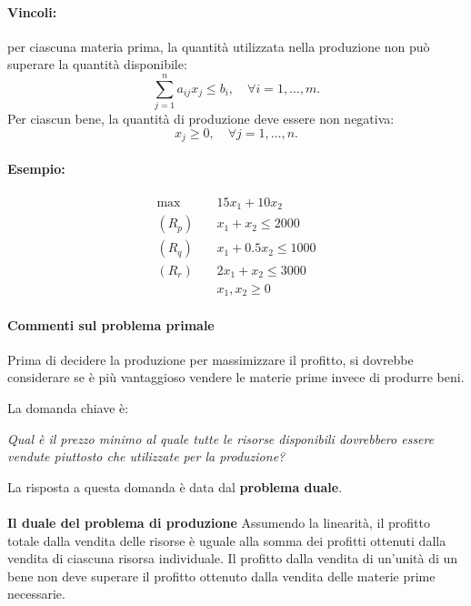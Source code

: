 \documentclass[a4paper, 11pt]{article}
\begin{document}
        \paragraph{Vincoli:} per ciascuna materia prima, la quantità utilizzata nella produzione non può superare la quantità disponibile:
        \[ \sum_{j=1}^{n} a_{ij} x_j \leq b_i, \quad \forall i=1,\dots,m. \]
        Per ciascun bene, la quantità di produzione deve essere non negativa:
        \[ x_j \geq 0, \quad \forall j=1,\dots,n. \]

        \paragraph{Esempio: }

        \begin{align*}
            \max & \quad 15x_{1} + 10x_{2} \\
            (R_p)& \quad x_{1} + x_{2} \leq 2000 \\
            (R_q) & \quad x_{1} + 0.5x_{2} \leq 1000 \\
            (R_r) & \quad 2x_{1} + x_{2} \leq 3000 \\
            & \quad x_{1}, x_{2} \geq 0
        \end{align*}

        \paragraph{Commenti sul problema primale}
        Prima di decidere la produzione per massimizzare il profitto, si dovrebbe considerare se è più vantaggioso vendere le materie prime invece di produrre beni.

        La domanda chiave è:

        \textit{Qual è il prezzo minimo al quale tutte le risorse disponibili dovrebbero essere vendute piuttosto che utilizzate per la produzione?}

        La risposta a questa domanda è data dal \textbf{problema duale}.

        \paragraph{}
        \textbf{Il duale del problema di produzione}
        Assumendo la linearità, il profitto totale dalla vendita delle risorse è uguale alla somma dei profitti ottenuti dalla vendita di ciascuna risorsa individuale. Il profitto dalla vendita di un'unità di un bene non deve superare il profitto ottenuto dalla vendita delle materie prime necessarie.
        
\end{document}
